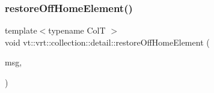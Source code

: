 \subsubsection{\texorpdfstring{restore\+Off\+Home\+Element()}{restoreOffHomeElement()}}
{\footnotesize\ttfamily template$<$typename ColT $>$ \\
void vt\+::vrt\+::collection\+::detail\+::restore\+Off\+Home\+Element (\begin{DoxyParamCaption}\item[{\hyperlink{structvt_1_1vrt_1_1collection_1_1_collection_manager_1_1_restore_migrate_col_msg}{Collection\+Manager\+::\+Restore\+Migrate\+Col\+Msg}$<$ ColT $>$ $\ast$}]{msg,  }\item[{ColT $\ast$}]{ }\end{DoxyParamCaption})\hspace{0.3cm}{\ttfamily [inline]}}

